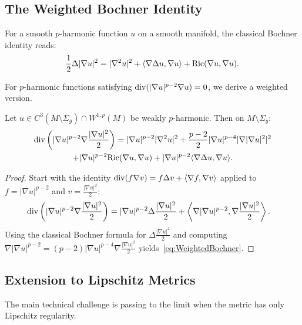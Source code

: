 \subsection{The Weighted Bochner Identity}
For a smooth $p$-harmonic function $u$ on a smooth manifold, the classical Bochner identity reads:
\begin{equation}
    \frac{1}{2} \Delta |\nabla u|^2 = |\nabla^2 u|^2 + \langle \nabla \Delta u, \nabla u \rangle + \mathrm{Ric}(\nabla u, \nabla u).
\end{equation}

For $p$-harmonic functions satisfying $\mathrm{div}(|\nabla u|^{p-2} \nabla u) = 0$, we derive a weighted version.

\begin{proposition}
Let $u \in C^3(M \setminus \Sigma_g) \cap W^{1,p}(M)$ be weakly $p$-harmonic. Then on $M \setminus \Sigma_g$:
\begin{multline}\label{eq:WeightedBochner}
    \mathrm{div}\left( |\nabla u|^{p-2} \nabla \frac{|\nabla u|^2}{2} \right) = |\nabla u|^{p-2} |\nabla^2 u|^2 + \frac{p-2}{2} |\nabla u|^{p-4} |\nabla |\nabla u|^2|^2 \\
    + |\nabla u|^{p-2} \mathrm{Ric}(\nabla u, \nabla u) + |\nabla u|^{p-2} \langle \nabla \Delta u, \nabla u \rangle.
\end{multline}
\end{proposition}

\begin{proof}
Start with the identity $\mathrm{div}(f \nabla v) = f \Delta v + \langle \nabla f, \nabla v \rangle$ applied to $f = |\nabla u|^{p-2}$ and $v = \frac{|\nabla u|^2}{2}$:
\begin{align*}
    \mathrm{div}\left( |\nabla u|^{p-2} \nabla \frac{|\nabla u|^2}{2} \right) &= |\nabla u|^{p-2} \Delta \frac{|\nabla u|^2}{2} + \left\langle \nabla |\nabla u|^{p-2}, \nabla \frac{|\nabla u|^2}{2} \right\rangle.
\end{align*}
Using the classical Bochner formula for $\Delta \frac{|\nabla u|^2}{2}$ and computing $\nabla |\nabla u|^{p-2} = (p-2) |\nabla u|^{p-4} \nabla \frac{|\nabla u|^2}{2}$ yields~\eqref{eq:WeightedBochner}.
\end{proof}

\subsection{Extension to Lipschitz Metrics}
The main technical challenge is passing to the limit when the metric has only Lipschitz regularity.

